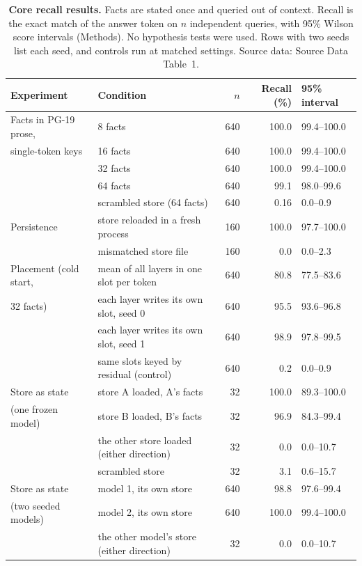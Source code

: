 \begin{table}[p]
\centering
\small
\caption{\textbf{Core recall results.} Facts are stated once and queried out of context.
Recall is the exact match of the answer token on $n$ independent queries, with 95\% Wilson
score intervals (Methods). No hypothesis tests were used. Rows with two seeds list each
seed, and controls run at matched settings. Source data: Source Data Table~1.}
\label{tab:core}
\setlength{\tabcolsep}{4pt}
\begin{tabular}{@{}llrrl@{}}
\toprule
Experiment & Condition & $n$ & Recall (\%) & 95\% interval \\
\midrule
Facts in PG-19 prose,        & 8 facts  & 640 & 100.0 & 99.4--100.0 \\
single-token keys            & 16 facts & 640 & 100.0 & 99.4--100.0 \\
                             & 32 facts & 640 & 100.0 & 99.4--100.0 \\
                             & 64 facts & 640 & 99.1 & 98.0--99.6 \\
                             & scrambled store (64 facts) & 640 & 0.16 & 0.0--0.9 \\
\midrule
Persistence                  & store reloaded in a fresh process & 160 & 100.0 & 97.7--100.0 \\
                             & mismatched store file & 160 & 0.0 & 0.0--2.3 \\
\midrule
Placement (cold start,       & mean of all layers in one slot per token & 640 & 80.8 & 77.5--83.6 \\
32 facts)                    & each layer writes its own slot, seed 0 & 640 & 95.5 & 93.6--96.8 \\
                             & each layer writes its own slot, seed 1 & 640 & 98.9 & 97.8--99.5 \\
                             & same slots keyed by residual (control) & 640 & 0.2 & 0.0--0.9 \\
\midrule
Store as state               & store A loaded, A's facts & 32 & 100.0 & 89.3--100.0 \\
(one frozen model)           & store B loaded, B's facts & 32 & 96.9 & 84.3--99.4 \\
                             & the other store loaded (either direction) & 32 & 0.0 & 0.0--10.7 \\
                             & scrambled store & 32 & 3.1 & 0.6--15.7 \\
\midrule
Store as state               & model 1, its own store & 640 & 98.8 & 97.6--99.4 \\
(two seeded models)          & model 2, its own store & 640 & 100.0 & 99.4--100.0 \\
                             & the other model's store (either direction) & 32 & 0.0 & 0.0--10.7 \\
\bottomrule
\end{tabular}
\end{table}

